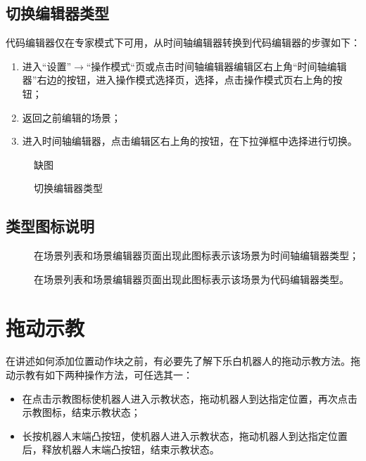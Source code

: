 \subsection{切换编辑器类型}

代码编辑器仅在专家模式下可用，从时间轴编辑器转换到代码编辑器的步骤如下：
\begin{enumerate}
\item 进入“设置”$\rightarrow$“操作模式“页或点击时间轴编辑器编辑区右上角“时间轴编辑器”右边的按钮，进入操作模式选择页，选择，点击操作模式页右上角的按钮；
\item 返回之前编辑的场景；
\item 进入时间轴编辑器，点击编辑区右上角的按钮，在下拉弹框中选择进行切换。
\end{enumerate}

\begin{figure}[ht]
	\centering
	\color{red}缺图
	\caption{切换编辑器类型}
	\label{fig:切换编辑器类型}
\end{figure}


\subsection{类型图标说明}
\begin{description}
	\item[] 在场景列表和场景编辑器页面出现此图标表示该场景为时间轴编辑器类型；
	\item[] 在场景列表和场景编辑器页面出现此图标表示该场景为代码编辑器类型。
\end{description}

\section{拖动示教}
在讲述如何添加位置动作块之前，有必要先了解下乐白机器人的拖动示教方法。拖动示教有如下两种操作方法，可任选其一：
\begin{itemize}
	\item 在\LM 点击示教图标使机器人进入示教状态，拖动机器人到达指定位置，再次点击示教图标，结束示教状态；
	\item 长按机器人末端凸按钮，使机器人进入示教状态，拖动机器人到达指定位置后，释放机器人末端凸按钮，结束示教状态。
\end{itemize}

